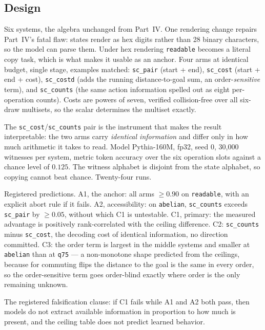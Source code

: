 \subsection{Design}

Six systems, the algebra unchanged from Part~IV. One rendering change repairs Part~IV's fatal flaw: states render as hex digits rather than 28 binary characters, so the model can parse them. Under hex rendering \texttt{readable} becomes a literal copy task, which is what makes it usable as an anchor. Four arms at identical budget, single stage, examples matched: \texttt{sc\_pair} (start + end), \texttt{sc\_cost} (start + end + cost), \texttt{sc\_costd} (adds the running distance-to-goal sum, an order-\emph{sensitive} term), and \texttt{sc\_counts} (the same action information spelled out as eight per-operation counts). Costs are powers of seven, verified collision-free over all six-draw multisets, so the scalar determines the multiset exactly.

The \texttt{sc\_cost}/\texttt{sc\_counts} pair is the instrument that makes the result interpretable: the two arms carry \emph{identical information} and differ only in how much arithmetic it takes to read. Model Pythia-160M, fp32, seed 0, 30{,}000 witnesses per system, metric token accuracy over the six operation slots against a chance level of $0.125$. The witness alphabet is disjoint from the state alphabet, so copying cannot beat chance. Twenty-four runs.

Registered predictions. A1, the anchor: all arms $\geq 0.90$ on \texttt{readable}, with an explicit abort rule if it fails. A2, accessibility: on \texttt{abelian}, \texttt{sc\_counts} exceeds \texttt{sc\_pair} by $\geq 0.05$, without which C1 is untestable. C1, primary: the measured advantage is positively rank-correlated with the ceiling difference. C2: \texttt{sc\_counts} minus \texttt{sc\_cost}, the decoding cost of identical information, no direction committed. C3: the order term is largest in the middle systems and smaller at \texttt{abelian} than at \texttt{q75} --- a non-monotone shape predicted from the ceilings, because for commuting flips the distance to the goal is the same in every order, so the order-sensitive term goes order-blind exactly where order is the only remaining unknown.

The registered falsification clause: if C1 fails while A1 and A2 both pass, then models do not extract available information in proportion to how much is present, and the ceiling table does not predict learned behavior.

